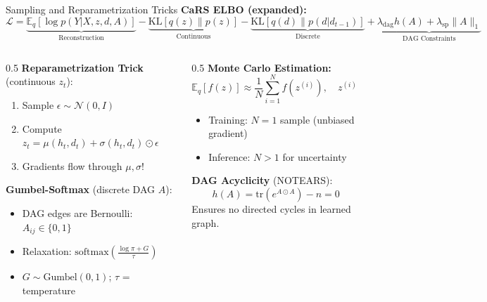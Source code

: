 \documentclass[aspectratio=169]{beamer}
\begin{document}
\begin{frame}{Sampling and Reparametrization Tricks}
\textbf{CaRS ELBO (expanded):}
\begin{equation*}
\mathcal{L} = \underbrace{\mathbb{E}_{q}[\log p(Y|X,z,d,A)]}_{\text{Reconstruction}} - \underbrace{\text{KL}[q(z) \| p(z)]}_{\text{Continuous}} - \underbrace{\text{KL}[q(d) \| p(d|d_{t-1})]}_{\text{Discrete}} + \underbrace{\lambda_{\text{dag}} h(A) + \lambda_{\text{sp}} \|A\|_1}_{\text{DAG Constraints}}
\end{equation*}

\begin{columns}
\begin{column}{0.5\textwidth}
\textbf{Reparametrization Trick} (continuous $z_t$):
\begin{enumerate}
    \item Sample $\epsilon \sim \mathcal{N}(0, I)$
    \item Compute $z_t = \mu(h_t, d_t) + \sigma(h_t, d_t) \odot \epsilon$
    \item \textcolor{reprogreen}{Gradients flow through $\mu, \sigma$!}
\end{enumerate}

\textbf{Gumbel-Softmax} (discrete DAG $A$):
\begin{itemize}
    \item DAG edges are Bernoulli: $A_{ij} \in \{0, 1\}$
    \item Relaxation: $\text{softmax}\!\left(\frac{\log \pi + G}{\tau}\right)$
    \item $G \sim \text{Gumbel}(0,1)$; $\tau$ = temperature
\end{itemize}
\end{column}

\begin{column}{0.5\textwidth}
\textbf{Monte Carlo Estimation:}
\begin{equation*}
\mathbb{E}_q[f(z)] \approx \frac{1}{N}\sum_{i=1}^N f(z^{(i)}), \quad z^{(i)} \sim q
\end{equation*}
\begin{itemize}
    \item Training: $N=1$ sample (unbiased gradient)
    \item Inference: $N > 1$ for uncertainty
\end{itemize}

\textbf{DAG Acyclicity} (NOTEARS):
\begin{equation*}
h(A) = \text{tr}(e^{A \odot A}) - n = 0
\end{equation*}
\scriptsize Ensures no directed cycles in learned graph.
\end{column}
\end{columns}
\end{frame}
\end{document}
